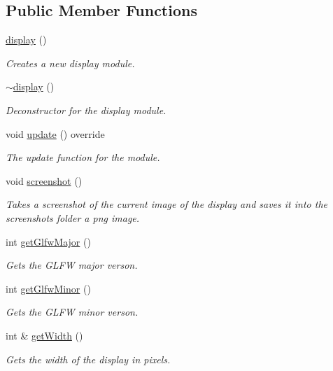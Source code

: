 \subsection*{Public Member Functions}
\begin{DoxyCompactItemize}
\item 
\hyperlink{classflounder_1_1display_ac0a3910222a928f1fc60193cd65c0530}{display} ()
\begin{DoxyCompactList}\small\item\em Creates a new display module. \end{DoxyCompactList}\item 
\hyperlink{classflounder_1_1display_a272f9080af9079cbb3890b18c3e4d394}{$\sim$display} ()
\begin{DoxyCompactList}\small\item\em Deconstructor for the display module. \end{DoxyCompactList}\item 
void \hyperlink{classflounder_1_1display_a799c6a76fcac1a0ca56dfd6b8d7993fa}{update} () override
\begin{DoxyCompactList}\small\item\em The update function for the module. \end{DoxyCompactList}\item 
void \hyperlink{classflounder_1_1display_af27b3f93977c32c79ad9522672e484c5}{screenshot} ()
\begin{DoxyCompactList}\small\item\em Takes a screenshot of the current image of the display and saves it into the screenshots folder a png image. \end{DoxyCompactList}\item 
int \hyperlink{classflounder_1_1display_a5e6a9e9ea60e2f8d0850ea689abb0569}{get\+Glfw\+Major} ()
\begin{DoxyCompactList}\small\item\em Gets the G\+L\+FW major verson. \end{DoxyCompactList}\item 
int \hyperlink{classflounder_1_1display_ac6fbd123308dce6a0d8f281a9ea55b37}{get\+Glfw\+Minor} ()
\begin{DoxyCompactList}\small\item\em Gets the G\+L\+FW minor verson. \end{DoxyCompactList}\item 
int \& \hyperlink{classflounder_1_1display_ac2b45bb8c8924b985895f2b08c03c3d9}{get\+Width} ()
\begin{DoxyCompactList}\small\item\em Gets the width of the display in pixels. \end{DoxyCompactList}\item 

\end{DoxyCompactItemize}

